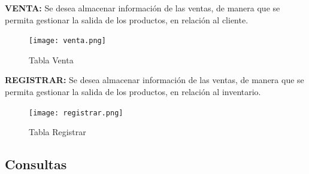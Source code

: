 \documentclass[30pt,fleqn]{article}
\begin{document}
\vspace{15mm} %


\textbf{VENTA: }Se desea almacenar información de las ventas, de manera que se permita gestionar la salida de los productos, en relación al cliente.

\vspace{5mm} %

\begin{figure}[h]
    \centering
    \texttt{[image: venta.png]}
    \caption{Tabla Venta}
    \label{fig:Tabla Venta}
\end{figure}

\vspace{15mm} %



\textbf{REGISTRAR:} Se desea almacenar información de las ventas, de manera que se permita gestionar la salida de los productos, en relación al inventario.

\vspace{5mm} %

\begin{figure}[h]
    \centering
    \texttt{[image: registrar.png]}
    \caption{Tabla Registrar}
    \label{fig:Tabla Registrar}
\end{figure}

\vspace{15mm} %



\newpage
\subsection{Consultas}

\end{document}
